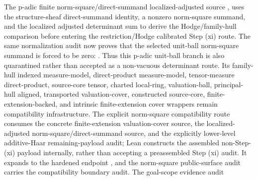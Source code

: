 \begin{proposition}
  The p-adic finite norm-square/direct-summand localized-adjusted source
  ,
  uses the structure-sheaf direct-summand identity, a nonzero norm-square
  summand, and the localized adjusted determinant sum to derive the
  Hodge/family-hull comparison before entering the restriction/Hodge calibrated
  Step (xi) route.  The same normalization audit now proves that the selected
  unit-ball norm-square summand is forced to be zero:
  .
  Thus this p-adic unit-ball branch is also quarantined rather than accepted as
  a non-vacuous determinant route.  Its family-hull indexed measure-model,
  direct-product measure-model, tensor-measure direct-product, source-core
  tensor, charted local-ring, valuation-ball, principal-hull aligned,
  transported valuation-cover, constructed source-core, finite-extension-backed,
  and intrinsic finite-extension cover wrappers remain compatibility
  infrastructure.  The
  explicit norm-square compatibility route
  consumes the concrete finite-extension valuation-cover source, the
  localized-adjusted norm-square/direct-summand source, and the explicitly
  lower-level additive-Haar remaining-payload audit; Lean constructs the
  assembled non-Step-(xi) payload internally, rather than accepting a
  preassembled Step (xi) audit.  It expands to the hardened endpoint
  ,
  and the norm-square public-surface audit
  carries the compatibility boundary audit.  The goal-scope evidence audit

\end{proposition}
